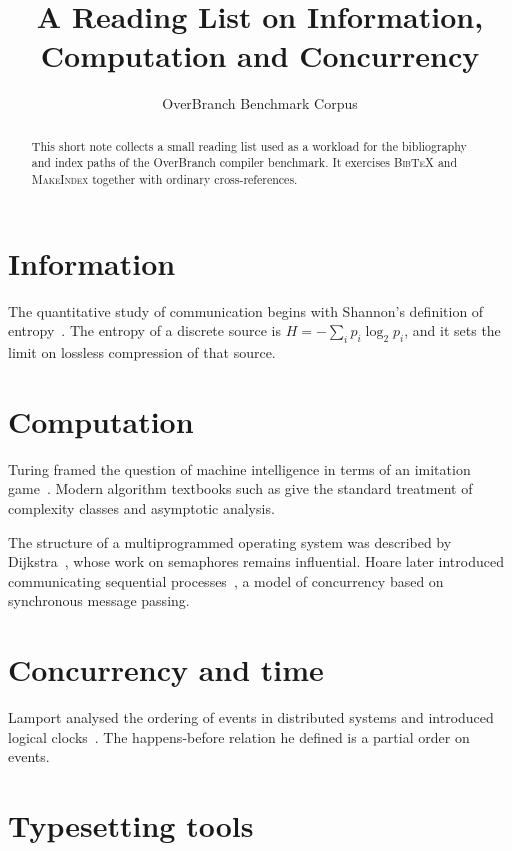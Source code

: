 \documentclass[11pt,a4paper]{article}
\title{A Reading List on Information, Computation and Concurrency}
\author{OverBranch Benchmark Corpus}
\date{}
\begin{document}
\maketitle

\begin{abstract}
  This short note collects a small reading list used as a workload for the
  bibliography and index paths of the OverBranch compiler benchmark. It
  exercises \textsc{BibTeX} and \textsc{MakeIndex} together with ordinary
  cross-references.
\end{abstract}

\section{Information}

The quantitative study of communication begins with Shannon's
definition of entropy~\cite{shannon1948}. The  entropy of a
discrete source is $H = -\sum_i p_i \log_2 p_i$, and it sets the limit on
lossless compression of that source.

\section{Computation}

Turing framed the question of machine intelligence in terms of an imitation
game~\cite{turing1950}. Modern algorithm textbooks such as
\cite{cormen2009} give the standard treatment of 
complexity classes and asymptotic analysis.

The structure of a multiprogrammed operating system was described by
Dijkstra~\cite{dijkstra1968}, whose work on  semaphores
remains influential. Hoare later introduced communicating sequential
processes~\cite{hoare1978}, a model of  concurrency based
on synchronous message passing.

\section{Concurrency and time}

Lamport analysed the ordering of events in distributed systems and introduced
logical clocks~\cite{lamport1978}. The  happens-before
relation he defined is a partial order on events.

\section{Typesetting tools}
\end{document}
